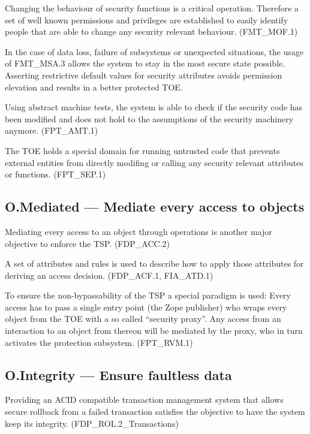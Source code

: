 \documentclass[12pt,english]{scrbook}
\begin{document}
    Changing the behaviour of security functions is a critical operation.
    Therefore a set of well known permissions and privileges are established to
    easily identify people that are able to change any security relevant
    behaviour. (FMT\_MOF.1)
    
    In the case of data loss, failure of subsystems or unexpected situations,
    the usage of FMT\_MSA.3 allows the system to stay in the most secure state
    possible. Asserting restrictive default values for security attributes
    avoids permission elevation and results in a better protected TOE.
    
    Using abstract machine tests, the system is able to check if the security
    code has been modified and does not hold to the assumptions of the security
    machinery anymore. (FPT\_AMT.1)

    The TOE holds a special domain for running untrusted code that prevents 
    external entities from directly modifing or calling any security relevant
    attributes or functions. (FPT\_SEP.1)

\subsection{O.Mediated --- Mediate every access to objects}

    Mediating every access to an object through operations is another major
    objective to enforce the TSP. (FDP\_ACC.2)

    A set of attributes and rules is used to describe how to apply those
    attributes for deriving an access decision. (FDP\_ACF.1, FIA\_ATD.1)  

    To ensure the non-bypassability of the TSP a special paradigm is used:
    Every access has to pass a single entry point (the Zope publisher) who
    wraps every object from the TOE with a so called ``security proxy''. Any
    access from an interaction to an object from thereon will be mediated by
    the proxy, who in turn activates the protection subsystem. (FPT\_RVM.1)
    
\subsection{O.Integrity --- Ensure faultless data}

    Providing an ACID compatible transaction management system that allows
    secure rollback from a failed transaction satisfies the objective to have
    the system keep its integrity. (FDP\_ROL.2\_Transactions)
\end{document}
